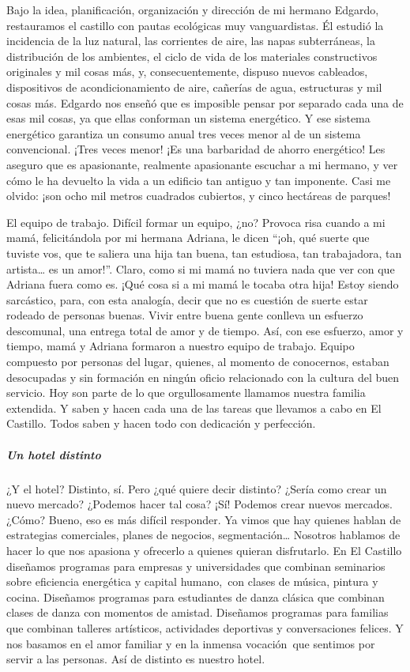 \documentclass[
]{article}
\begin{document}
Bajo la idea, planificación, organización y dirección de mi hermano
Edgardo, restauramos el castillo con pautas ecológicas muy
vanguardistas. Él estudió la incidencia de la luz natural, las
corrientes de aire, las napas subterráneas, la distribución de los
ambientes, el ciclo de vida de los materiales constructivos originales y
mil cosas más, y, consecuentemente, dispuso nuevos cableados,
dispositivos de acondicionamiento de aire, cañerías de agua, estructuras
y mil cosas más. Edgardo nos enseñó que es imposible pensar por separado
cada una de esas mil cosas, ya que ellas conforman un sistema
energético. Y ese sistema energético garantiza un consumo anual tres
veces menor al de un sistema convencional. ¡Tres veces menor! ¡Es una
barbaridad de ahorro energético! Les aseguro que es apasionante,
realmente apasionante escuchar a mi hermano, y ver cómo le ha devuelto
la vida a un edificio tan antiguo y tan imponente. Casi me olvido: ¡son
ocho mil metros cuadrados cubiertos, y cinco hectáreas de parques!

El equipo de trabajo. Difícil formar un equipo, ¿no? Provoca risa cuando
a mi mamá, felicitándola por mi hermana Adriana, le dicen ``¡oh, qué
suerte que tuviste vos, que te saliera una hija tan buena, tan
estudiosa, tan trabajadora, tan artista\ldots{} es un amor!''. Claro,
como si mi mamá no tuviera nada que ver con que Adriana fuera como es.
¡Qué cosa si a mi mamá le tocaba otra hija! Estoy siendo sarcástico,
para, con esta analogía, decir que no es cuestión de suerte estar
rodeado de personas buenas. Vivir entre buena gente conlleva un esfuerzo
descomunal, una entrega total de amor y de tiempo. Así, con ese
esfuerzo, amor y tiempo, mamá y Adriana formaron a nuestro equipo de
trabajo. Equipo compuesto por personas del lugar, quienes, al momento de
conocernos, estaban desocupadas y sin formación en ningún oficio
relacionado con la cultura del buen servicio. Hoy son parte de lo que
orgullosamente llamamos nuestra familia extendida. Y saben y hacen cada
una de las tareas que llevamos a cabo en El Castillo. Todos saben y
hacen todo con dedicación y perfección.

\hypertarget{un-hotel-distinto}{%
\subparagraph{Un hotel distinto}\label{un-hotel-distinto}}

¿Y el hotel? Distinto, sí. Pero ¿qué quiere decir distinto? ¿Sería como
crear un nuevo mercado? ¿Podemos hacer tal cosa? ¡Sí! Podemos crear
nuevos mercados. ¿Cómo? Bueno, eso es más difícil responder. Ya vimos
que hay quienes hablan de estrategias comerciales, planes de negocios,
segmentación\ldots{} Nosotros hablamos de hacer lo que nos apasiona y
ofrecerlo a quienes quieran disfrutarlo. En El Castillo diseñamos
programas para empresas y universidades que combinan seminarios sobre
eficiencia energética y capital humano,~con clases de música, pintura y
cocina. Diseñamos programas para estudiantes de danza clásica que
combinan clases de danza con momentos de amistad. Diseñamos programas
para familias que combinan talleres artísticos, actividades deportivas y
conversaciones felices. Y nos basamos en el amor familiar y en la
inmensa vocación~que sentimos por servir a las personas. Así de distinto
es nuestro hotel.
\end{document}
